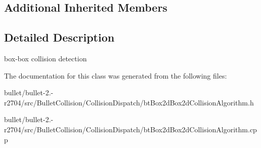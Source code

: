 \subsection*{Additional Inherited Members}


\subsection{Detailed Description}
box-\/box collision detection 

The documentation for this class was generated from the following files\+:\begin{DoxyCompactItemize}
\item 
bullet/bullet-\/2.-\/r2704/src/\+Bullet\+Collision/\+Collision\+Dispatch/bt\+Box2d\+Box2d\+Collision\+Algorithm.\+h\item 
bullet/bullet-\/2.-\/r2704/src/\+Bullet\+Collision/\+Collision\+Dispatch/bt\+Box2d\+Box2d\+Collision\+Algorithm.\+cpp\end{DoxyCompactItemize}
